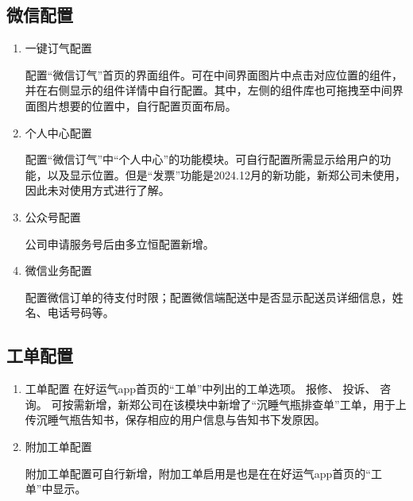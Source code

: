\documentclass[UTF8]{ctexart}
\begin{document}
\subsection{微信配置}
\begin{enumerate}
	\item 一键订气配置
	
	配置“微信订气”首页的界面组件。可在中间界面图片中点击对应位置的组件，并在右侧显示的组件详情中自行配置。其中，左侧的组件库也可拖拽至中间界面图片想要的位置中，自行配置页面布局。
	
	\item 个人中心配置
	
	配置“微信订气”中“个人中心”的功能模块。可自行配置所需显示给用户的功能，以及显示位置。但是“发票”功能是2024.12月的新功能，新郑公司未使用，因此未对使用方式进行了解。
	
	\item 公众号配置
	
	公司申请服务号后由多立恒配置新增。
	
	\item 微信业务配置
	
	配置微信订单的待支付时限；配置微信端配送中是否显示配送员详细信息，姓名、电话号码等。
\end{enumerate}


\subsection{工单配置}
\begin{enumerate}
	\item 工单配置
	在好运气app首页的“工单”中列出的工单选项。
	报修、
	投诉、
	咨询。
	可按需新增，新郑公司在该模块中新增了“沉睡气瓶排查单”工单，用于上传沉睡气瓶告知书，保存相应的用户信息与告知书下发原因。
	
	\item 附加工单配置
	
	附加工单配置可自行新增，附加工单启用是也是在在好运气app首页的“工单”中显示。
	
	
\end{enumerate}
\end{document}
